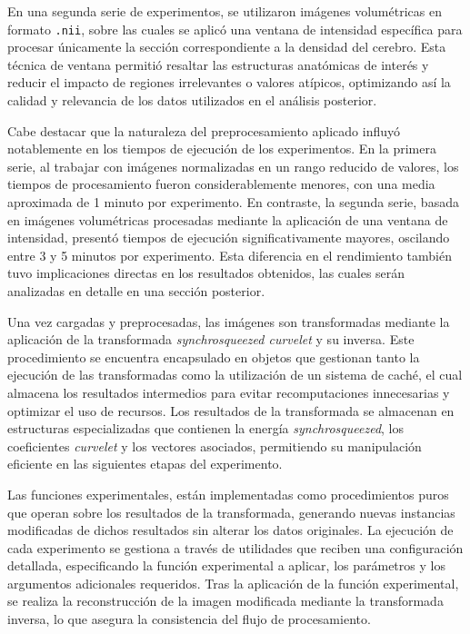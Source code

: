 En una segunda serie de experimentos, se utilizaron imágenes volumétricas en formato \texttt{.nii}, sobre las cuales se aplicó una ventana de intensidad específica para procesar únicamente la sección correspondiente a la densidad del cerebro. Esta técnica de ventana permitió resaltar las estructuras anatómicas de interés y reducir el impacto de regiones irrelevantes o valores atípicos, optimizando así la calidad y relevancia de los datos utilizados en el análisis posterior.

Cabe destacar que la naturaleza del preprocesamiento aplicado influyó notablemente en los tiempos de ejecución de los experimentos. En la primera serie, al trabajar con imágenes normalizadas en un rango reducido de valores, los tiempos de procesamiento fueron considerablemente menores, con una media aproximada de 1 minuto por experimento. En contraste, la segunda serie, basada en imágenes volumétricas procesadas mediante la aplicación de una ventana de intensidad, presentó tiempos de ejecución significativamente mayores, oscilando entre 3 y 5 minutos por experimento. Esta diferencia en el rendimiento también tuvo implicaciones directas en los resultados obtenidos, las cuales serán analizadas en detalle en una sección posterior.%

Una vez cargadas y preprocesadas, las imágenes son transformadas mediante la aplicación de la transformada \textit{synchrosqueezed curvelet} y su inversa. Este procedimiento se encuentra encapsulado en objetos que gestionan tanto la ejecución de las transformadas como la utilización de un sistema de caché, el cual almacena los resultados intermedios para evitar recomputaciones innecesarias y optimizar el uso de recursos. Los resultados de la transformada se almacenan en estructuras especializadas que contienen la energía \textit{synchrosqueezed}, los coeficientes \textit{curvelet} y los vectores asociados, permitiendo su manipulación eficiente en las siguientes etapas del experimento.

Las funciones experimentales, están implementadas como procedimientos puros que operan sobre los resultados de la transformada, generando nuevas instancias modificadas de dichos resultados sin alterar los datos originales. La ejecución de cada experimento se gestiona a través de utilidades que reciben una configuración detallada, especificando la función experimental a aplicar, los parámetros y los argumentos adicionales requeridos. Tras la aplicación de la función experimental, se realiza la reconstrucción de la imagen modificada mediante la transformada inversa, lo que asegura la consistencia del flujo de procesamiento.

